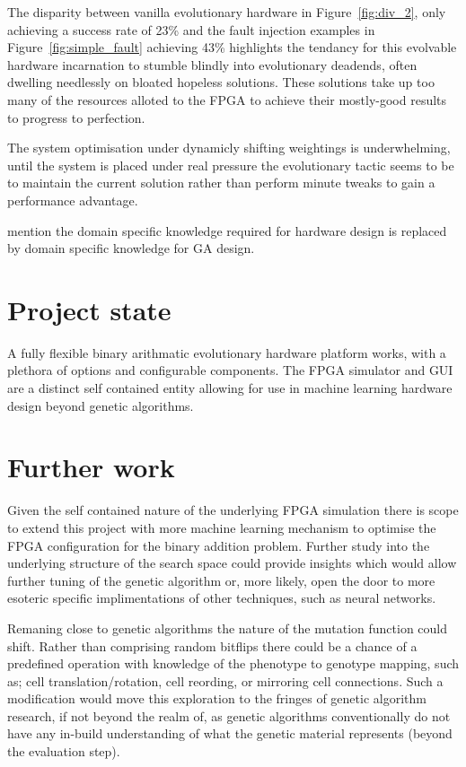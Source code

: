 The disparity between vanilla evolutionary hardware in Figure~\ref{fig:div_2}, only
achieving a success rate of 23\% and the fault injection examples in
Figure~\ref{fig:simple_fault} achieving 43\% highlights the tendancy for
this evolvable hardware incarnation to stumble blindly into evolutionary deadends,
often dwelling needlessly on bloated hopeless solutions. These solutions take up
too many of the resources alloted to the FPGA to achieve their mostly-good results
to progress to perfection.

The system optimisation under dynamicly shifting weightings is underwhelming,
until the system is placed under real pressure the evolutionary tactic seems to be
to maintain the current solution rather than perform minute tweaks to gain a performance
advantage.

\todo mention the domain specific knowledge required for hardware design is
replaced by domain specific knowledge for GA design.

\section{Project state}
A fully flexible binary arithmatic evolutionary hardware platform works, with
a plethora of options and configurable components. The FPGA simulator and GUI are a distinct
self contained entity allowing for use in machine learning hardware design beyond
genetic algorithms.

\section{Further work}
Given the self contained nature of the underlying FPGA simulation there is scope to
extend this project with more machine learning mechanism to optimise the FPGA
configuration for the binary addition problem. Further study into the underlying
structure of the search space could provide insights which would allow further
tuning of the genetic algorithm or, more likely, open the door to more esoteric
specific implimentations of other techniques, such as neural networks.

Remaning close to genetic algorithms the nature of the mutation function
could shift. Rather than comprising random bitflips there could be a chance
of a predefined operation with knowledge of the phenotype to genotype mapping,
such as; cell translation/rotation, cell reording, or mirroring cell connections.
Such a modification would move this exploration to the fringes of genetic algorithm
research, if not beyond the realm of, as genetic algorithms conventionally do not
have any in-build understanding of what the genetic material represents (beyond the
evaluation step).

